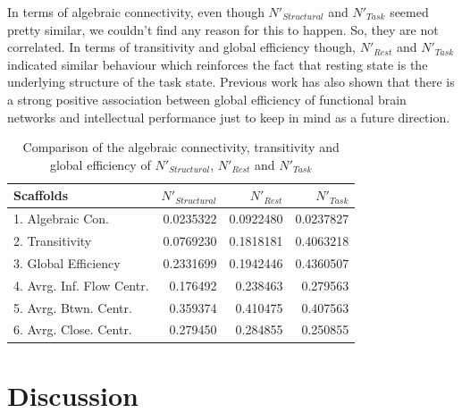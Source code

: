 \documentclass[9pt,twocolumn,twoside,lineno]{pnas-new}
\begin{document}
In terms of algebraic connectivity, even though $N'_{Structural}$ and $N'_{Task}$ seemed pretty similar, we couldn't find any reason for this to happen. So, they are not correlated. In terms of transitivity and global efficiency though, $N'_{Rest}$ and $N'_{Task}$ indicated similar behaviour which reinforces the fact that resting state is the underlying structure of the task state. Previous work has also shown that  there is a strong positive association between global efficiency of functional brain networks and intellectual performance\cite{intellectual} just to keep in mind as a future direction.


\begin{table}%
\centering
\caption{Comparison of the algebraic connectivity, transitivity and global efficiency of $N'_{Structural}$, $N'_{Rest}$ and $N'_{Task}$}
\begin{tabular}{lrrr}
Scaffolds & $N'_{Structural}$ &  $N'_{Rest}$ & $N'_{Task}$  \\
\midrule
1. Algebraic Con. & 0.0235322 & 0.0922480 & 0.0237827 \\
2. Transitivity & 0.0769230  & 0.1818181 & 0.4063218 \\
3. Global Efficiency & 0.2331699 & 0.1942446 & 0.4360507\\
4. Avrg. Inf. Flow Centr. & 0.176492 &0.238463 &0.279563\\
5. Avrg. Btwn. Centr. & 0.359374 & 0.410475 &0.407563\\
6. Avrg. Close. Centr. & 0.279450 & 0.284855 & 0.250855\\  
\bottomrule
\end{tabular}

\end{table}

\section*{Discussion}
\end{document}
